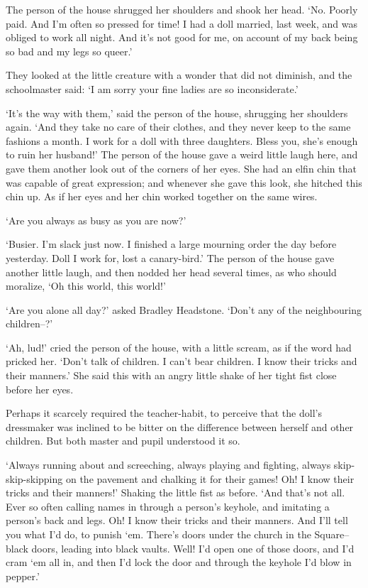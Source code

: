 The person of the house shrugged her shoulders and shook her head. ‘No.
Poorly paid. And I’m often so pressed for time! I had a doll married,
last week, and was obliged to work all night. And it’s not good for me,
on account of my back being so bad and my legs so queer.’

They looked at the little creature with a wonder that did not diminish,
and the schoolmaster said: ‘I am sorry your fine ladies are so
inconsiderate.’

‘It’s the way with them,’ said the person of the house, shrugging her
shoulders again. ‘And they take no care of their clothes, and they
never keep to the same fashions a month. I work for a doll with three
daughters. Bless you, she’s enough to ruin her husband!’ The person of
the house gave a weird little laugh here, and gave them another look out
of the corners of her eyes. She had an elfin chin that was capable of
great expression; and whenever she gave this look, she hitched this chin
up. As if her eyes and her chin worked together on the same wires.

‘Are you always as busy as you are now?’

‘Busier. I’m slack just now. I finished a large mourning order the day
before yesterday. Doll I work for, lost a canary-bird.’ The person of
the house gave another little laugh, and then nodded her head several
times, as who should moralize, ‘Oh this world, this world!’

‘Are you alone all day?’ asked Bradley Headstone. ‘Don’t any of the
neighbouring children--?’

‘Ah, lud!’ cried the person of the house, with a little scream, as
if the word had pricked her. ‘Don’t talk of children. I can’t bear
children. I know their tricks and their manners.’ She said this with an
angry little shake of her tight fist close before her eyes.

Perhaps it scarcely required the teacher-habit, to perceive that the
doll’s dressmaker was inclined to be bitter on the difference between
herself and other children. But both master and pupil understood it so.

‘Always running about and screeching, always playing and fighting,
always skip-skip-skipping on the pavement and chalking it for their
games! Oh! I know their tricks and their manners!’ Shaking the little
fist as before. ‘And that’s not all. Ever so often calling names in
through a person’s keyhole, and imitating a person’s back and legs. Oh!
I know their tricks and their manners. And I’ll tell you what I’d do, to
punish ‘em. There’s doors under the church in the Square--black doors,
leading into black vaults. Well! I’d open one of those doors, and I’d
cram ‘em all in, and then I’d lock the door and through the keyhole I’d
blow in pepper.’

